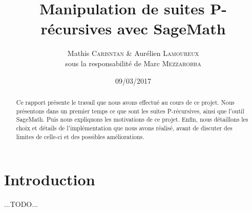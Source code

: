 \documentclass[final,12pt]{article}
\begin{document}
%
\title{Manipulation de suites P-récursives avec SageMath}
\author{Mathis \textsc{Carisntan} \& Aurélien \textsc{Lamoureux} \\ {\small sous la responsabilité de Marc \textsc{Mezzarobba}}}
%
\date{09/03/2017}

\maketitle
%
\begin{abstract}
    Ce rapport présente le travail que nous avons effectué au cours de ce projet.
    Nous présentons dans un premier temps ce que sont les suites P-récursives,
    ainsi que l'outil SageMath. Puis nous expliquons les motivations de ce projet.
    Enfin, nous détaillons les choix et détails de l'implémentation que nous avons réalisé,
    avant de discuter des limites de celle-ci et des possibles améliorations.
\end{abstract}

\section{Introduction}
    \label{sec:intro}
    {\color{red} ...TODO...}
\end{document}

